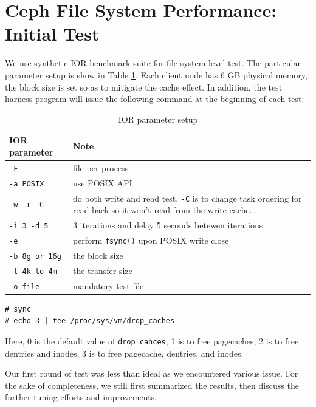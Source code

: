 \documentclass{article}
\begin{document}
\section{Ceph File System Performance: Initial Test}

We use synthetic IOR benchmark suite for file system level test. The particular
parameter setup is show in Table \ref{tbl:ior}. Each client node has 6 GB
physical memory, the block size is set so as to mitigate the cache effect. In
addition, the test harness program will issue the following command at the
beginning of each test:




\begin{table}[tb]
\centering
\begin{tabular}{p{1.5in} | p{3in}}
    \toprule
    IOR parameter & Note \\ \midrule
    \verb!-F! & file per process \\ \midrule
    \verb!-a POSIX! & use POSIX API \\ \midrule
    \verb!-w -r -C! & do both write and read test, \verb!-C! is to change task
        ordering for read back so it won't read from the write cache. \\ \midrule
    \verb!-i 3 -d 5! & 3 iterations and delay 5 seconds betewen iterations \\
    \midrule  
    \verb!-e! & perform \verb!fsync()! upon POSIX write close \\ \midrule
    \verb!-b 8g or 16g! & the block size \\ \midrule
    \verb!-t 4k to 4m! & the transfer size \\ \midrule
    \verb!-o file! & mandatory test file  \\    
    \bottomrule
\end{tabular}
\caption{IOR parameter setup}
\label{tbl:ior}
\end{table}


\begin{Verbatim}
# sync
# echo 3 | tee /proc/sys/vm/drop_caches
\end{Verbatim}


Here, 0 is the default value of \verb!drop_cahces!; 1 is to free pagecaches, 2
is to free dentries and inodes, 3 is to free pagecache, dentries, and inodes.


Our first round of test was less than ideal as we encountered various issue. For
the sake of completeness, we still first summarized the results, then discuss
the further tuning efforts and improvements.
\end{document}
